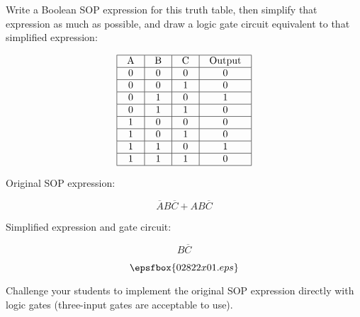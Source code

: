 

Write a Boolean SOP expression for this truth table, then simplify that expression as much as possible, and draw a logic gate circuit equivalent to that simplified expression:


$$\vbox{\offinterlineskip
\halign{\strut
\vrule \quad\hfil # \ \hfil & 
\vrule \quad\hfil # \ \hfil & 
\vrule \quad\hfil # \ \hfil & 
\vrule \quad\hfil # \ \hfil \vrule \cr
\noalign{\hrule}
%
A & B & C & Output \cr
%
\noalign{\hrule}
%
0 & 0 & 0 & 0 \cr
%
\noalign{\hrule}
%
0 & 0 & 1 & 0 \cr
%
\noalign{\hrule}
%
0 & 1 & 0 & 1 \cr
%
\noalign{\hrule}
%
0 & 1 & 1 & 0 \cr
%
\noalign{\hrule}
%
1 & 0 & 0 & 0 \cr
%
\noalign{\hrule}
%
1 & 0 & 1 & 0 \cr
%
\noalign{\hrule}
%
1 & 1 & 0 & 1 \cr
%
\noalign{\hrule}
%
1 & 1 & 1 & 0 \cr
%
\noalign{\hrule}
} %
}$$ %







Original SOP expression:

$$\overline{A} B \overline{C} + A B \overline{C}$$

Simplified expression and gate circuit:

$$B \overline{C}$$

$$\epsfbox{02822x01.eps}$$







Challenge your students to implement the original SOP expression directly with logic gates (three-input gates are acceptable to use). 




